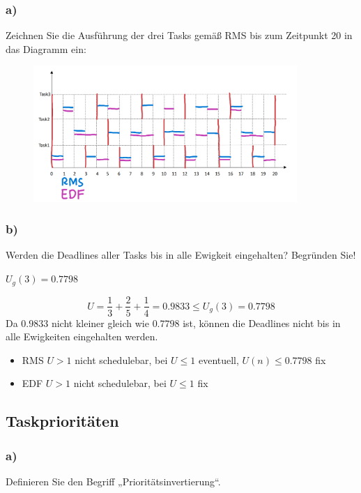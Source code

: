 \subsubsection{a)}
Zeichnen Sie die Ausführung der drei Tasks gemäß RMS bis zum Zeitpunkt 20 in das Diagramm ein: 

\begin{figure}[H]
  \includegraphics[width=10cm]{images/KA160322/3a.PNG}
  \centering
\end{figure}

\subsubsection{b)}
Werden die Deadlines aller Tasks bis in alle Ewigkeit eingehalten? Begründen Sie!

$U_g(3) = 0.7798$

\begin{equation}
  U = \frac{1}{3} + \frac{2}{5} + \frac{1}{4} = 0.9833 \leq U_g(3) = 0.7798
\end{equation}
Da $0.9833$ nicht kleiner gleich wie $0.7798$ ist, können die Deadlines nicht bis in alle Ewigkeiten eingehalten werden.\\

\begin{itemize}
  \item RMS $U > 1$ nicht schedulebar, bei $U \leq 1$ eventuell, $U(n) \leq 0.7798$ fix
  \item EDF $U > 1$ nicht schedulebar, bei $U \leq 1$ fix
\end{itemize}



\subsection{Taskprioritäten}
\subsubsection{a)}
Definieren Sie den Begriff „Prioritätsinvertierung“.

